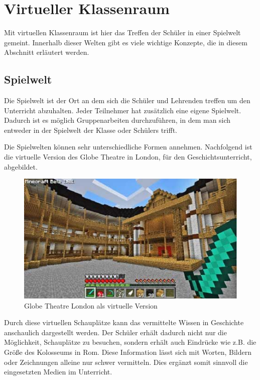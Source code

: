 \section{Virtueller Klassenraum}
Mit virtuellen Klassenraum ist hier das Treffen der Schüler in einer Spielwelt gemeint.
Innerhalb dieser Welten gibt es viele wichtige Konzepte, die in diesem Abschnitt erläutert werden.
\subsection{Spielwelt}
Die Spielwelt ist der Ort an dem sich die Schüler und Lehrenden treffen um den Unterricht abzuhalten. Jeder Teilnehmer hat zusätzlich eine eigene Spielwelt. Dadurch ist es möglich Gruppenarbeiten durchzuführen, in dem man sich entweder in der Spielwelt der Klasse oder Schülers trifft.

Die Spielwelten können sehr unterschiedliche Formen annehmen. Nachfolgend ist die virtuelle Version des Globe Theatre in London, für den Geschichtsunterricht, abgebildet.

\begin{figure}[ht]
	\centering
	\includegraphics[width=\textwidth,height=\textheight,keepaspectratio]{images/GlobeTheatreLondon.png}
	\caption{Globe Theatre London als virtuelle Version \cite{EdutopiaIdeas}}
	\label{globeTheatreLondon}
\end{figure}

Durch diese virtuellen Schauplätze kann das vermittelte Wissen in Geschichte anschaulich dargestellt werden. Der Schüler erhält dadurch nicht nur die Möglichkeit, Schauplätze zu besuchen, sondern erhält auch Eindrücke wie z.B. die Größe des Kolosseums in Rom. Diese Information lässt sich mit Worten, Bildern oder Zeichnungen alleine nur schwer vermitteln. Dies ergänzt somit sinnvoll die eingesetzten Medien im Unterricht.\cite{EdutopiaIdeas}

